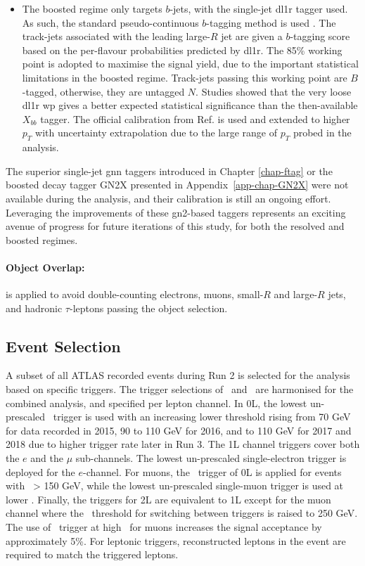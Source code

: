 \begin{itemize}[leftmargin=*]
\item The boosted regime only targets $b$-jets, with the single-jet \gls{dl1r} tagger used. As such, the standard pseudo-continuous $b$-tagging method is used \cite{atlas:FTAGRUN2}. The track-jets associated with the leading large-$R$ jet are given a $b$-tagging score based on the per-flavour probabilities predicted by \gls{dl1r}. The 85\% working point is adopted to maximise the signal yield, due to the important statistical limitations in the boosted regime. Track-jets passing this working point are $B$-tagged, otherwise, they are untagged $N$. Studies showed that the very loose \gls{dl1r} \gls{wp} gives a better expected statistical significance than the then-available $X_{bb}$ tagger. The official calibration from Ref. \cite{atlas:FTAGRUN2} is used and extended to higher $p_T$ with uncertainty extrapolation due to the large range of $p_T$ probed in the analysis.
\end{itemize}
The superior single-jet \gls{gnn} taggers introduced in Chapter \ref{chap-ftag} or the boosted decay tagger GN2X \cite{ATL-PHYS-PUB-2023-021} presented in Appendix~\ref{app-chap-GN2X} were not available during the analysis, and their calibration is still an ongoing effort. Leveraging the improvements of these \gls{gn2}-based taggers represents an exciting avenue of progress for future iterations of this study, for both the resolved and boosted regimes. 

\paragraph{Object Overlap:} is applied to avoid double-counting electrons, muons, small-$R$ and large-$R$ jets, and hadronic $\tau$-leptons passing the object selection.

\subsection{Event Selection}\label{sec-regimeCat}
A subset of all ATLAS recorded events during Run 2 is selected for the analysis based on specific triggers. The trigger selections of \vhb\ and \vhc\ are harmonised for the combined analysis, and specified per lepton channel. In 0L, the lowest un-prescaled \etm\ trigger is used with an increasing lower threshold rising from 70 GeV for data recorded in 2015, 90 to 110 GeV for 2016, and to 110 GeV for 2017 and 2018 due to higher trigger rate later in Run 3. The 1L channel triggers cover both the $e$ and the $\mu$ sub-channels. The lowest un-prescaled single-electron trigger is deployed for the $e$-channel. For muons, the \etm\ trigger of 0L is applied for events with \ptv\ > 150 GeV, while the lowest un-prescaled single-muon trigger is used at lower \ptv. Finally, the triggers for 2L are equivalent to 1L except for the muon channel where the \ptv\ threshold for switching between triggers is raised to 250 GeV. The use of \etm\ trigger at high \ptv\ for muons increases the signal acceptance by approximately 5\%. For leptonic triggers, reconstructed leptons in the event are required to match the triggered leptons. \\ 

